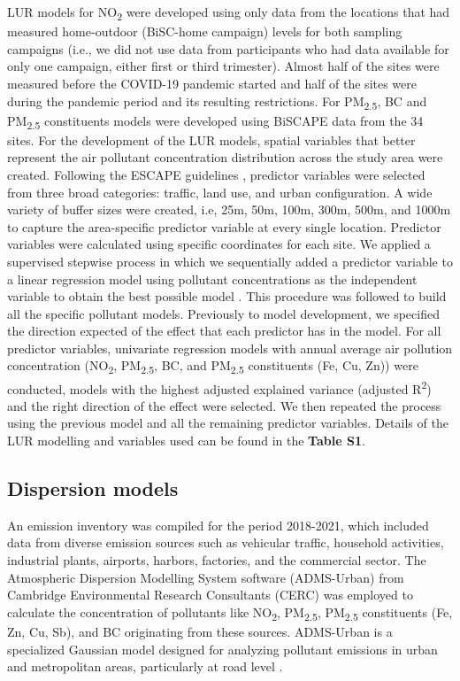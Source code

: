 \documentclass{article}
\begin{document}
LUR models for NO\textsubscript{2}  were developed using only data from the locations that had measured home-outdoor (BiSC-home campaign) levels for both sampling campaigns (i.e., we did not use data from participants who had data available for only one campaign, either first or third trimester). Almost half of the sites were measured before the COVID-19 pandemic started and half of the sites were during the pandemic period and its resulting restrictions. For PM\textsubscript{2.5}, BC  and PM\textsubscript{2.5} constituents models were developed using BiSCAPE data from the 34 sites. For the development of the LUR models, spatial variables that better represent the air pollutant concentration distribution across the study area were created. Following the ESCAPE guidelines \cite{eeftens2012, beelen2013},  predictor variables were selected from three broad categories: traffic, land use, and urban configuration. A wide variety of buffer sizes were created, i.e, 25m, 50m, 100m, 300m, 500m, and 1000m to capture the area-specific predictor variable at every single location. Predictor variables were calculated using specific coordinates for each site. We applied a supervised stepwise process in which we sequentially added a predictor variable to a linear regression model using pollutant concentrations as the independent variable to obtain the best possible model \cite{eeftens2012, beelen2013}. This procedure was followed to build all the specific pollutant models. Previously to model development, we specified the direction expected of the effect that each predictor has in the model. For all predictor variables, univariate regression models with annual average air pollution concentration (NO\textsubscript{2}, PM\textsubscript{2.5}, BC, and PM\textsubscript{2.5} constituents (Fe, Cu, Zn)) were conducted, models with the highest adjusted explained variance (adjusted R\textsuperscript{2}) and the right direction of the effect were selected. We then repeated the process using the previous model and all the remaining predictor variables. Details of the LUR modelling and variables used can be found in the \textbf{Table S1}.

\subsection{Dispersion models}

An emission inventory was compiled for the period 2018-2021, which included data from diverse emission sources such as vehicular traffic, household activities, industrial plants, airports, harbors, factories, and the commercial sector. The Atmospheric Dispersion Modelling System software (ADMS-Urban) from Cambridge Environmental Research Consultants (CERC) was employed to calculate the concentration of pollutants like NO\textsubscript{2}, PM\textsubscript{2.5}, PM\textsubscript{2.5} constituents (Fe, Zn, Cu, Sb), and BC originating from these sources. ADMS-Urban is a specialized Gaussian model designed for analyzing pollutant emissions in urban and metropolitan areas, particularly at road level \cite{mchugh1997adms}.
\end{document}
